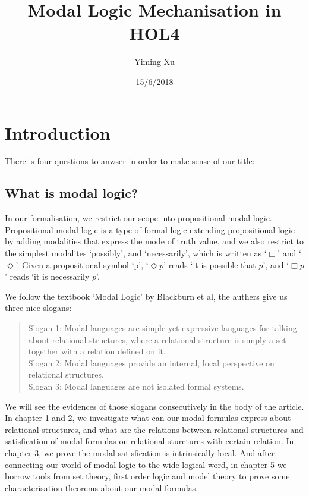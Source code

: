 \documentclass[letterpaper]{article}
\title{Modal Logic Mechanisation in HOL4}
\author{Yiming Xu}
\date{15/6/2018}
\begin{document}
\maketitle

\section{Introduction}

There is four questions to anwser in order to make sense of our title:

\subsection{What is modal logic?}

In our formalisation, we restrict our scope into propositional modal logic. Propositional modal logic is a type of formal logic extending propositional logic by adding modalities that express the mode of truth value, and we also restrict to the simplest modalites `possibly', and `necessarily', which is written as `$\Box$' and `$\Diamond$'. Given a propositional symbol `p', `$\Diamond p$' reads `it is possible that $p$', and `$\Box p$' reads `it is necessarily $p$'.

We follow the textbook `Modal Logic' by Blackburn et al, the authers give us three nice slogans:

\begin{quotation}
  Slogan 1: Modal languages are simple yet expressive languages for talking about relational structures, where a relational structure is simply a set together with a relation defined on it.\\
  Slogan 2: Modal languages provide an internal, local perspective on relational structures.\\
  Slogan 3: Modal languages are not isolated formal systems.

\end{quotation}
We will see the evidences of those slogans consecutively in the body of the article. In chapter 1 and 2, we investigate what can our modal formulas express about relational structures, and what are the relations between relational structures and satisfication of modal formulas on relational sturctures with certain relation. In chapter 3, we prove the modal satisfication is intrinsically local. And after connecting our world of modal logic to the wide logical word, in chapter 5 we borrow tools from set theory, first order logic and model theory to prove some characterisation theorems about our modal formulas. 
\end{document}
